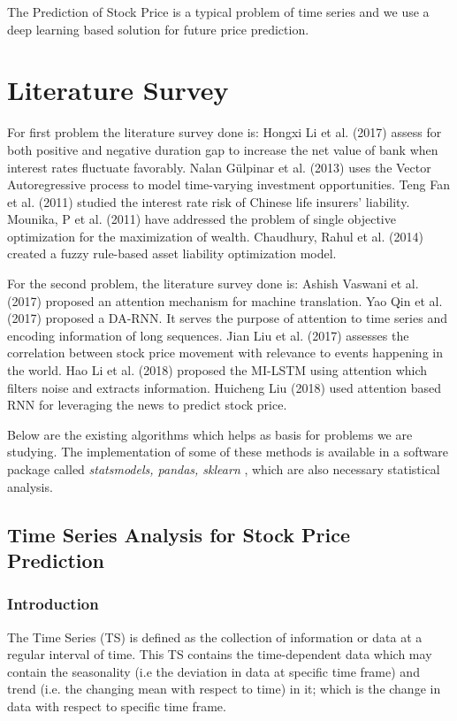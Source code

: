 		The Prediction of Stock Price is a typical problem of time series and we use a deep learning based solution for future price prediction.

\section{Literature Survey}

	For first problem the literature survey done is: Hongxi Li et al. (2017) assess for both positive and negative duration gap to increase the net value of bank when interest rates fluctuate favorably\cite{4}. Nalan Gülpinar et al. (2013) uses the Vector Autoregressive process to model time-varying investment opportunities\cite{3}. Teng Fan et al. (2011) studied the interest rate risk of Chinese life insurers’ liability\cite{1}. Mounika, P et al. (2011) have addressed the problem of single objective optimization for the maximization of wealth\cite{16}. Chaudhury, Rahul et al. (2014) created a fuzzy rule-based asset liability optimization model\cite{17}.

	For the second problem, the literature survey done is: Ashish Vaswani et al. (2017) proposed an attention mechanism for machine translation\cite{2}. Yao Qin et al. (2017) proposed a DA-RNN. It serves the purpose of attention to time series and encoding information of long sequences\cite{6}. Jian Liu et al. (2017) assesses the correlation between stock price movement with relevance to events happening in the world\cite{7}. Hao Li et al. (2018) proposed the MI-LSTM using attention which filters noise and extracts information\cite{8}. Huicheng Liu (2018) used attention based RNN for leveraging the news to predict stock price\cite{9}.

Below are the existing algorithms which helps as basis for problems we are studying. The implementation of some of these methods is available in a software package called \emph{statsmodels, pandas, sklearn} \cite{5} \cite{12}, which are also necessary statistical analysis.



\subsection{Time Series Analysis for Stock Price Prediction}

	\subsubsection{Introduction}
		The Time Series (TS) is defined as the collection of information or data at a regular interval of time. This TS contains the time-dependent data which may contain the seasonality (i.e the deviation in data at specific time frame) and trend (i.e. the changing mean with respect to time) in it; which is the change in data with respect to specific time frame.


